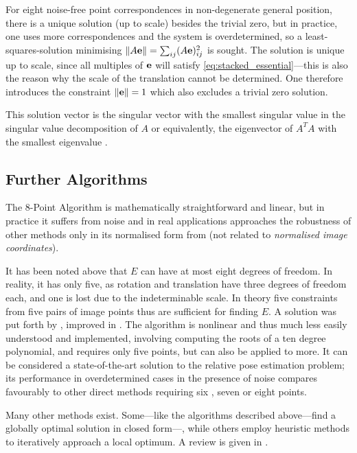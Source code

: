 \newcommand{\norm}[1]{\left\lVert#1\right\rVert}

For eight noise-free point correspondences in non-degenerate general position, there is a
unique solution (up to scale) besides the trivial zero, but in practice, one
uses more correspondences and the system is overdetermined, so a
least-squares-solution minimising $\norm{ A\mbf{e} } = \sum_{ij}
(A\mbf{e})_{ij}^2$ is sought.  The solution is unique up to scale, since all
multiples of $\mathbf{e}$ will satisfy \eqref{eq:stacked_essential}---this is also
the reason why the scale of the translation cannot be determined. One therefore
introduces the constraint $\norm{ \mbf{e} } = 1$ which also excludes a trivial
zero solution.

This solution vector is the singular
vector with the smallest singular value in the singular value decomposition of
$A$ or equivalently, the eigenvector of $A^TA$ with the smallest eigenvalue
\citep[see][]{hartley1997}.

\subsection{Further Algorithms}

The 8-Point Algorithm is mathematically straightforward and linear, but in
practice it suffers from noise \citep[see][]{luong1993} and in real
applications approaches the robustness of other methods only in its normalised
form from \citep{hartley1997} (not related to \emph{normalised image
coordinates}).

It has been noted above that $E$ can have at most eight degrees of freedom. In
reality, it has only five, as rotation and translation have three degrees of
freedom each, and one is lost due to the indeterminable scale. In theory five
constraints from five pairs of image points thus are sufficient for finding $E$.
A solution was put forth by \citet{nister2004}, improved in
\citep{stewenius-engels-nister2006}. The algorithm is nonlinear and
thus much less easily understood and implemented, involving computing the roots
of a ten degree polynomial, and requires only five points, but can also be
applied to more. It can be considered a state-of-the-art solution to the
relative pose estimation problem; its performance in overdetermined cases in the
presence of noise compares favourably to other
direct methods requiring six \citep{pizarro2003}, seven or eight points.

Many other methods exist. Some---like the algorithms described above---find a
globally optimal solution in closed form---, while others employ heuristic
methods to iteratively approach a local optimum. A review is given in \citep{zhang1998}.

